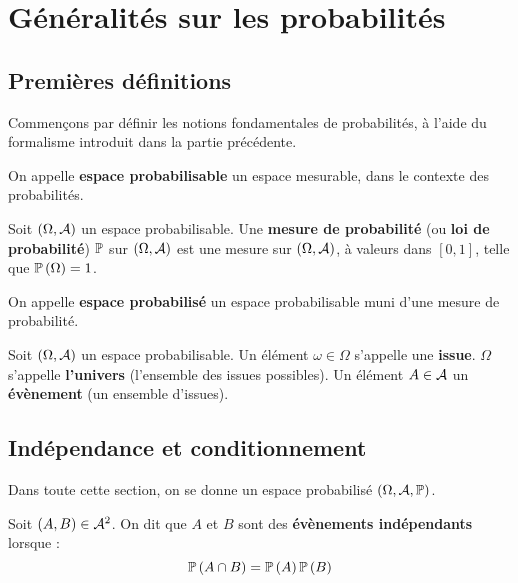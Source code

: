 \documentclass[../integ-proba.tex]{subfiles}
\begin{document}
    \chapter{Généralités sur les probabilités}

    \section{Premières définitions}

    Commençons par définir les notions fondamentales de probabilités, à l'aide du formalisme introduit dans la partie précédente.

    \begin{defi}
        On appelle \textbf{espace probabilisable} un espace mesurable, dans le contexte des probabilités.
    \end{defi}

    \begin{defi}
        Soit $\left(\Omega, \mathcal{A}\right)$ un espace probabilisable.
        Une \textbf{mesure de probabilité} (ou \textbf{loi de probabilité}) $\mathbb{P}$ sur $\left(\Omega, \mathcal{A}\right)$ est une mesure sur $\left(\Omega, \mathcal{A}\right)$, à valeurs dans $\left[0,1\right]$, telle que $\mathbb{P}\left(\Omega\right)=1$.
    \end{defi}

    \begin{defi}
        On appelle \textbf{espace probabilisé} un espace probabilisable muni d'une mesure de probabilité.
    \end{defi}

    \begin{defi}
        Soit $\left( \Omega, \mathcal{A} \right)$ un espace probabilisable.
        Un élément $\omega \in \Omega$ s'appelle une \textbf{issue}.
        $\Omega$ s'appelle \textbf{l'univers} (l'ensemble des issues possibles).
        Un élément $A \in \mathcal{A}$ un \textbf{évènement} (un ensemble d'issues).
    \end{defi}

    \section{Indépendance et conditionnement}

    Dans toute cette section, on se donne un espace probabilisé $\left( \Omega, \mathcal{A}, \mathbb{P} \right)$.

    \begin{defi}
        Soit $\left( A,B \right) \in \mathcal{A}^2$.
        On dit que $A$ et $B$ sont des \textbf{évènements indépendants} lorsque :
        \begin{displaymath}
            \mathbb{P}\left( A \cap B \right) = \mathbb{P}\left( A \right) \mathbb{P} \left( B \right)
        \end{displaymath}
    \end{defi}
\end{document}
